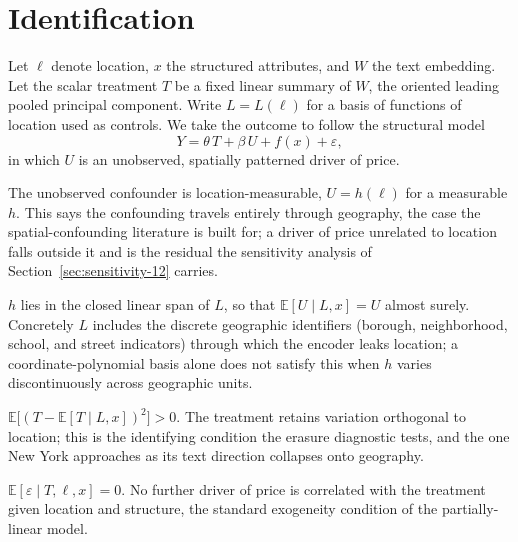 
\section{Identification}
\label{sec:identification}

Let $\ell$ denote location, $x$ the structured attributes, and $W$ the text
embedding. Let the scalar treatment $T$ be a fixed linear summary of $W$, the
oriented leading pooled principal component. Write $L=L(\ell)$ for a basis of
functions of location used as controls. We take the outcome to follow the
structural model
\begin{equation}
Y=\theta\,T+\beta\,U+f(x)+\varepsilon,
\label{eq:struct}
\end{equation}
in which $U$ is an unobserved, spatially patterned driver of price.

\begin{assumption}\label{as:id-U}
The unobserved confounder is location-measurable, $U=h(\ell)$ for a measurable $h$.
This says the confounding travels entirely through geography, the case the
spatial-confounding literature is built for; a driver of price unrelated to location
falls outside it and is the residual the sensitivity analysis of
Section~\ref{sec:sensitivity-12} carries.
\end{assumption}
\begin{assumption}\label{as:id-basis}
$h$ lies in the closed linear span of $L$, so that $\mathbb{E}[U\mid L,x]=U$ almost
surely. Concretely $L$ includes the discrete geographic identifiers (borough,
neighborhood, school, and street indicators) through which the encoder leaks
location; a coordinate-polynomial basis alone does not satisfy this when $h$ varies
discontinuously across geographic units.
\end{assumption}
\begin{assumption}\label{as:id-overlap}
$\mathbb{E}\big[(T-\mathbb{E}[T\mid L,x])^2\big]>0$. The treatment retains variation
orthogonal to location; this is the identifying condition the erasure diagnostic
tests, and the one New York approaches as its text direction collapses onto
geography.
\end{assumption}
\begin{assumption}[Exogeneity]\label{as:id-exog}
$\mathbb{E}[\varepsilon\mid T,\ell,x]=0$. No further driver of price is correlated with
the treatment given location and structure, the standard exogeneity condition of the
partially-linear model.
\end{assumption}

